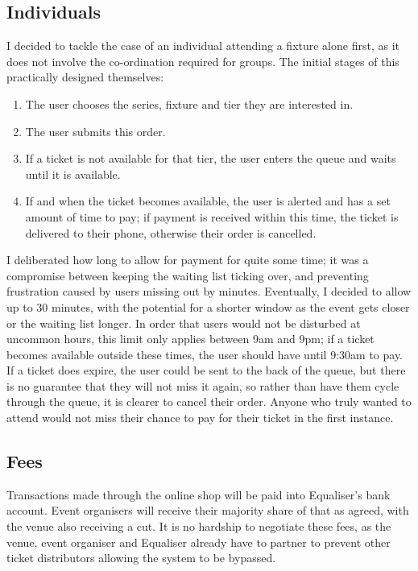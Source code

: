 \documentclass[12pt,a4paper]{bhamdissertation}
\begin{document}
\subsection{Individuals}

I decided to tackle the case of an individual attending a fixture alone first, as it does not involve the co-ordination required for groups. The initial stages of this practically designed themselves:

\begin{enumerate}
    \item The user chooses the series, fixture and tier they are interested in.
    \item The user submits this order.
    \item If a ticket is not available for that tier, the user enters the queue and waits until it is available.
    \item If and when the ticket becomes available, the user is alerted and has a set amount of time to pay; if payment is received within this time, the ticket is delivered to their phone, otherwise their order is cancelled.
\end{enumerate}

I deliberated how long to allow for payment for quite some time; it was a compromise between keeping the waiting list ticking over, and preventing frustration caused by users missing out by minutes. Eventually, I decided to allow up to 30 minutes, with the potential for a shorter window as the event gets closer or the waiting list longer. In order that users would not be disturbed at uncommon hours, this limit only applies between 9am and 9pm; if a ticket becomes available outside these times, the user should have until 9:30am to pay. If a ticket does expire, the user could be sent to the back of the queue, but there is no guarantee that they will not miss it again, so rather than have them cycle through the queue, it is clearer to cancel their order. Anyone who truly wanted to attend would not miss their chance to pay for their ticket in the first instance.

\subsection{Fees}

Transactions made through the online shop will be paid into Equaliser's bank account. Event organisers will receive their majority share of that as agreed, with the venue also receiving a cut. It is no hardship to negotiate these fees, as the venue, event organiser and Equaliser already have to partner to prevent other ticket distributors allowing the system to be bypassed.
\end{document}
